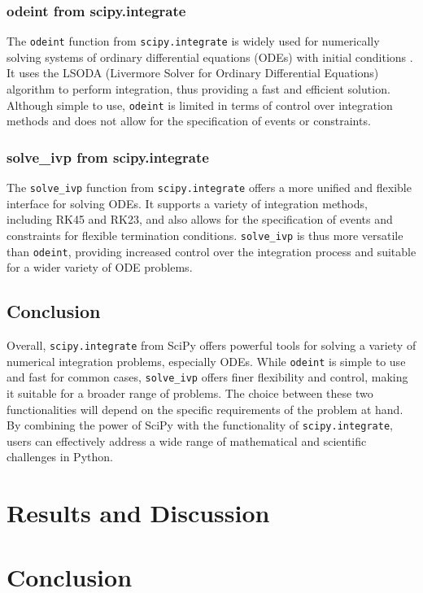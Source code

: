 \documentclass{article}
\begin{document}
\subsubsection{odeint from scipy.integrate}
The \texttt{odeint} function from \texttt{scipy.integrate} is widely used for numerically solving systems of ordinary differential equations (ODEs) with initial conditions \cite{scipy_ode}. It uses the LSODA (Livermore Solver for Ordinary Differential Equations) algorithm to perform integration, thus providing a fast and efficient solution. Although simple to use, \texttt{odeint} is limited in terms of control over integration methods and does not allow for the specification of events or constraints.
\subsubsection{solve\_ivp from scipy.integrate}
The \texttt{solve\_ivp} function from \texttt{scipy.integrate} offers a more unified and flexible interface for solving ODEs. It supports a variety of integration methods, including RK45 and RK23, and also allows for the specification of events and constraints for flexible termination conditions. \texttt{solve\_ivp} is thus more versatile than \texttt{odeint}, providing increased control over the integration process and suitable for a wider variety of ODE problems.
\subsection{Conclusion}
Overall, \texttt{scipy.integrate} from SciPy offers powerful tools for solving a variety of numerical integration problems, especially ODEs. While \texttt{odeint} is simple to use and fast for common cases, \texttt{solve\_ivp} offers finer flexibility and control, making it suitable for a broader range of problems. The choice between these two functionalities will depend on the specific requirements of the problem at hand. By combining the power of SciPy with the functionality of \texttt{scipy.integrate}, users can effectively address a wide range of mathematical and scientific challenges in Python.

\section{Results and Discussion}


\section{Conclusion}



\end{document}
